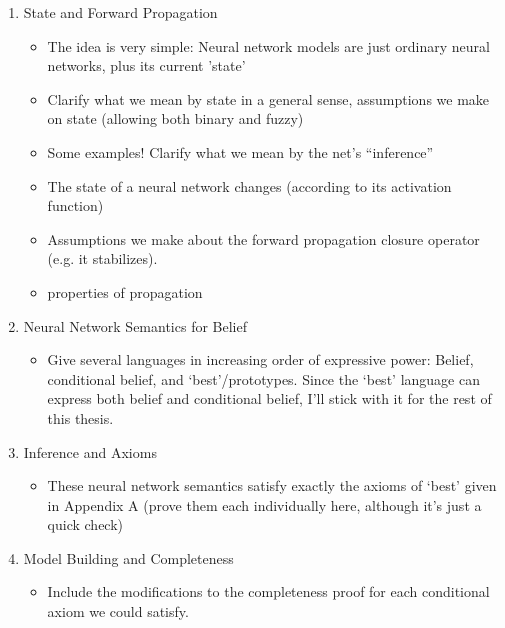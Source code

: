 \documentclass[letterpaper]{article}
\begin{document}
\begin{enumerate}
\begin{enumerate}
        \item State and Forward Propagation
        \begin{itemize}
            \item The idea is very simple: Neural network models are just ordinary neural networks, plus its current 'state'
            \item Clarify what we mean by state in a general sense, assumptions we make on state (allowing both binary and fuzzy)
            \item Some examples!  Clarify what we mean by the net's ``inference''
            \item The state of a neural network changes (according to its activation function)
            \item Assumptions we make about the forward propagation closure operator (e.g. it stabilizes).
            \item properties of propagation
        \end{itemize}

        \item Neural Network Semantics for Belief
        \begin{itemize}
            \item Give several languages in increasing order of expressive power: Belief, conditional belief, and `best'/prototypes.  Since the `best' language can express both belief and conditional belief, I'll stick with it for the rest of this thesis.
        \end{itemize}

        \item Inference and Axioms
        \begin{itemize}
            \item These neural network semantics satisfy exactly the axioms of `best' given in Appendix A (prove them each individually here, although it's just a quick check)
        \end{itemize}
        
        \item Model Building and Completeness
        \begin{itemize}
            \item Include the modifications to the completeness proof for each conditional axiom we could satisfy.
        \end{itemize}
        

\end{enumerate}
\end{enumerate}
\end{document}
